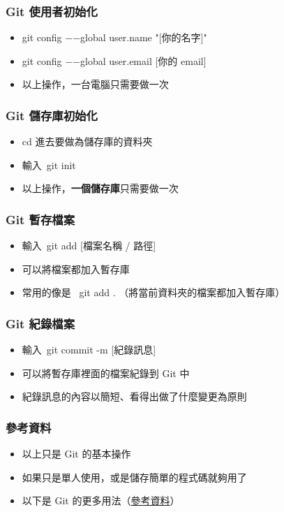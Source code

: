 \documentclass[mathserif]{beamer}
\begin{document}
\begin{frame}
    \frametitle{Git 使用者初始化}
    \begin{itemize}
        \item {\color{red} git config −−global user.name "[你的名字]"}
        \item {\color{red} git config −−global user.email [你的 email]}
        \item 以上操作，一台電腦只需要做一次
    \end{itemize}
\end{frame}

\begin{frame}
    \frametitle{Git 儲存庫初始化}
    \begin{itemize}
        \item {\color{red}cd} 進去要做為儲存庫的資料夾
        \item 輸入\ {\color{red}git init}
        \item 以上操作，\textbf{一個儲存庫}只需要做一次
    \end{itemize}
\end{frame}

\begin{frame}
    \frametitle{Git 暫存檔案}
    \begin{itemize}
        \item 輸入\ {\color{red}git add [檔案名稱 / 路徑]}
        \item 可以將檔案都加入暫存庫
        \vspace{0.5cm}
        \item<2-> 常用的像是\ {\color{red} git add .} （將當前資料夾的檔案都加入暫存庫）
    \end{itemize}
\end{frame}

\begin{frame}
    \frametitle{Git 紀錄檔案}
    \begin{itemize}
        \item 輸入\ {\color{red}git commit -m [紀錄訊息]}
        \item 可以將暫存庫裡面的檔案紀錄到 Git 中
        \vspace{0.5cm}
        \item<2-> 紀錄訊息的內容以簡短、看得出做了什麼變更為原則
    \end{itemize}
\end{frame}

\begin{frame}
    \frametitle{參考資料}
    \begin{itemize}
        \item 以上只是 Git 的基本操作
        \item 如果只是單人使用，或是儲存簡單的程式碼就夠用了
        \item 以下是 Git 的更多用法（\href{https://backlog.com/git-tutorial/tw/}{參考資料}）
    \end{itemize}
\end{frame}
\end{document}
